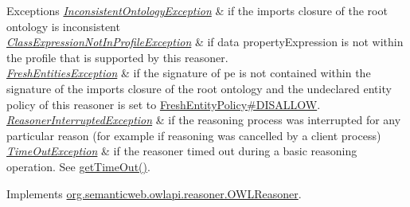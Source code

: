 \begin{DoxyExceptions}{Exceptions}
{\em \hyperlink{classorg_1_1semanticweb_1_1owlapi_1_1reasoner_1_1_inconsistent_ontology_exception}{Inconsistent\-Ontology\-Exception}} & if the imports closure of the root ontology is inconsistent \\
\hline
{\em \hyperlink{classorg_1_1semanticweb_1_1owlapi_1_1reasoner_1_1_class_expression_not_in_profile_exception}{Class\-Expression\-Not\-In\-Profile\-Exception}} & if {\ttfamily data property\-Expression} is not within the profile that is supported by this reasoner. \\
\hline
{\em \hyperlink{classorg_1_1semanticweb_1_1owlapi_1_1reasoner_1_1_fresh_entities_exception}{Fresh\-Entities\-Exception}} & if the signature of {\ttfamily pe} is not contained within the signature of the imports closure of the root ontology and the undeclared entity policy of this reasoner is set to \hyperlink{enumorg_1_1semanticweb_1_1owlapi_1_1reasoner_1_1_fresh_entity_policy_a762eae6d5b2449d125311ecaabfdc8d0}{Fresh\-Entity\-Policy\#\-D\-I\-S\-A\-L\-L\-O\-W}. \\
\hline
{\em \hyperlink{classorg_1_1semanticweb_1_1owlapi_1_1reasoner_1_1_reasoner_interrupted_exception}{Reasoner\-Interrupted\-Exception}} & if the reasoning process was interrupted for any particular reason (for example if reasoning was cancelled by a client process) \\
\hline
{\em \hyperlink{classorg_1_1semanticweb_1_1owlapi_1_1reasoner_1_1_time_out_exception}{Time\-Out\-Exception}} & if the reasoner timed out during a basic reasoning operation. See \hyperlink{classorg_1_1semanticweb_1_1owlapi_1_1reasoner_1_1impl_1_1_o_w_l_reasoner_base_af55342eaaabb1b72dacfde7a181b93d2}{get\-Time\-Out()}. \\
\hline
\end{DoxyExceptions}


Implements \hyperlink{interfaceorg_1_1semanticweb_1_1owlapi_1_1reasoner_1_1_o_w_l_reasoner_a827a1e3436adcb93bb66b639012e3bb5}{org.\-semanticweb.\-owlapi.\-reasoner.\-O\-W\-L\-Reasoner}.

